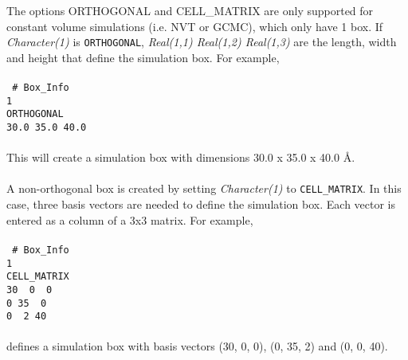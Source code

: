 The options ORTHOGONAL and CELL\_MATRIX are only supported for constant volume simulations (i.e. NVT or GCMC),
which only have 1 box. If {\it Character(1)} is \texttt{ORTHOGONAL}, \emph{Real(1,1) Real(1,2) Real(1,3)} are the length, 
width and height that define the simulation box. For example, \\ \\
%
\texttt{
\# Box\_Info \\
 1 \\
 ORTHOGONAL \\
 30.0 35.0 40.0} \\ \\
%
This will create a simulation box with dimensions 30.0 x 35.0 x 40.0 \AA. \\ \\
%
A non-orthogonal box is created by setting {\it Character(1)} to \texttt{CELL\_MATRIX}. 
In this case, three basis vectors are needed to define the simulation box.
Each vector is entered as a column of a 3x3 matrix.  
For example, \\ \\
%
\texttt{
\# Box\_Info \\
 1 \\
 CELL\_MATRIX \\
 30 ~0 ~0\\
\hspace*{0.5em}0 35 ~0\\
\hspace*{0.5em}0 ~2 40} \\ \\
%
defines a simulation box with basis vectors (30, 0, 0), (0, 35, 2) and (0, 0, 40).
%
%
%
%
%
